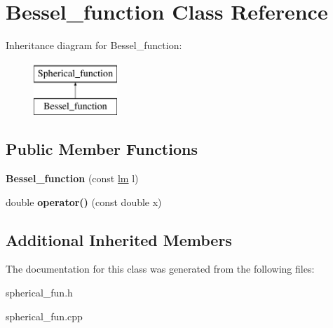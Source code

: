 \hypertarget{classBessel__function}{}\section{Bessel\+\_\+function Class Reference}
\label{classBessel__function}
Inheritance diagram for Bessel\+\_\+function\+:\begin{figure}[H]
\begin{center}
\leavevmode
\includegraphics[height=2.000000cm]{classBessel__function}
\end{center}
\end{figure}
\subsection*{Public Member Functions}
\begin{DoxyCompactItemize}
\item 
\mbox{\label{classBessel__function_acd510b87d95ff582c967e1dbaf49a4b3}} 
{\bfseries Bessel\+\_\+function} (const \hyperlink{structlm}{lm} l)
\item 
\mbox{\label{classBessel__function_a7af0b3054971c3c7027e2076da112c2c}} 
double {\bfseries operator()} (const double x)
\end{DoxyCompactItemize}
\subsection*{Additional Inherited Members}


The documentation for this class was generated from the following files\+:\begin{DoxyCompactItemize}
\item 
spherical\+\_\+fun.\+h\item 
spherical\+\_\+fun.\+cpp\end{DoxyCompactItemize}
